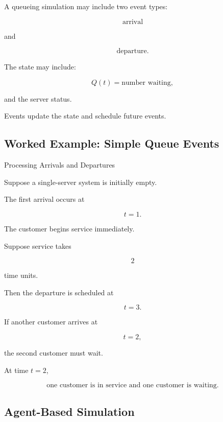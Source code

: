 A queueing simulation may include two event types:

\[
\boxed{
\text{arrival}
}
\]

and

\[
\boxed{
\text{departure}.
}
\]

The state may include:

\[
\boxed{
Q(t)
=
\text{number waiting},
}
\]

and the server status.

Events update the state and schedule future events.

\subsection{Worked Example: Simple Queue Events}
\label{subsec:worked-simple-queue-events}

\begin{workedexamplebox}{Processing Arrivals and Departures}

Suppose a single-server system is initially empty.

The first arrival occurs at

\[
t=1.
\]

The customer begins service immediately.

Suppose service takes

\[
2
\]

time units.

Then the departure is scheduled at

\[
t=3.
\]

If another customer arrives at

\[
t=2,
\]

the second customer must wait.

\begin{answerbox}
At time \(t=2\),

\[
\boxed{
\text{one customer is in service and one customer is waiting.}
}
\]
\end{answerbox}

\end{workedexamplebox}

\subsection{Agent-Based Simulation}
\label{subsec:agent-based-simulation}

